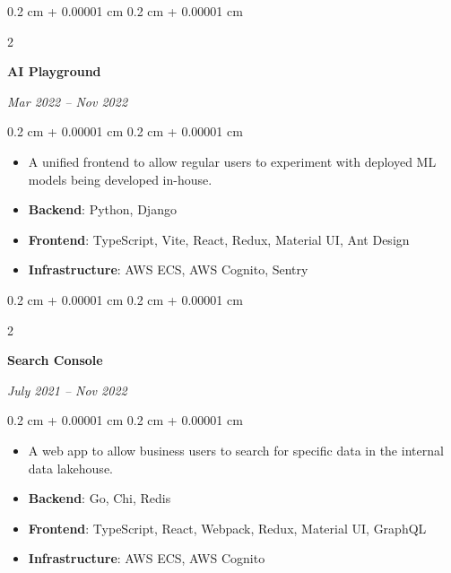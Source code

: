 \documentclass[10pt, a4paper]{article}
\newenvironment{highlights}{
    \begin{itemize}[
        topsep=0.10 cm,
        parsep=0.10 cm,
        partopsep=0pt,
        itemsep=0pt,
        leftmargin=0.4 cm + 10pt
    ]
}{
    \end{itemize}
} %
\newenvironment{onecolentry}{
    \begin{adjustwidth}{
        0.2 cm + 0.00001 cm
    }{
        0.2 cm + 0.00001 cm
    }
}{
    \end{adjustwidth}
} %
\newenvironment{twocolentry}[2][]{
    \onecolentry
    \def\secondColumn{#2}
    \setcolumnwidth{\fill, 4.5 cm}
    \begin{paracol}{2}
}{
    \switchcolumn \raggedleft \secondColumn
    \end{paracol}
    \endonecolentry
} %
\begin{document}
        \vspace{0.2 cm}

        \begin{twocolentry}{
            
            
        \textit{Mar 2022 – Nov 2022}}
            \textbf{AI Playground}
        \end{twocolentry}

        \vspace{0.10 cm}
        \begin{onecolentry}
            \begin{highlights}
                \item A unified frontend to allow regular users to experiment with deployed ML models being developed in-house.
                \item \textbf{Backend}: Python, Django
                \item \textbf{Frontend}: TypeScript, Vite, React, Redux, Material UI, Ant Design
                \item \textbf{Infrastructure}: AWS ECS, AWS Cognito, Sentry
            \end{highlights}
        \end{onecolentry}


        \vspace{0.2 cm}

        \begin{twocolentry}{
            
            
        \textit{July 2021 – Nov 2022}}
            \textbf{Search Console}
        \end{twocolentry}

        \vspace{0.10 cm}
        \begin{onecolentry}
            \begin{highlights}
                \item A web app to allow business users to search for specific data in the internal data lakehouse.
                \item \textbf{Backend}: Go, Chi, Redis
                \item \textbf{Frontend}: TypeScript, React, Webpack, Redux, Material UI, GraphQL
                \item \textbf{Infrastructure}: AWS ECS, AWS Cognito
            \end{highlights}
        \end{onecolentry}
\end{document}
